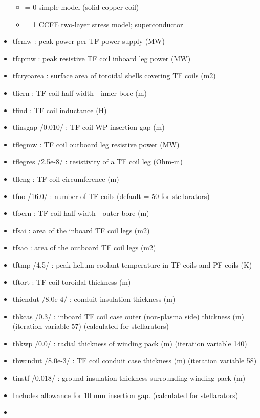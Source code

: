 \documentclass[]{article}
\begin{document}
\begin{itemize}
  \begin{itemize}
  \itemsep1pt\parskip0pt
  \item
    = 0 simple model (solid copper coil)
  \item
    = 1 CCFE two-layer stress model; superconductor
  \end{itemize}
\item
  tfcmw : peak power per TF power supply (MW)
\item
  tfcpmw : peak resistive TF coil inboard leg power (MW)
\item
  tfcryoarea : surface area of toroidal shells covering TF coils (m2)
\item
  tficrn : TF coil half-width - inner bore (m)
\item
  tfind : TF coil inductance (H)
\item
  tfinsgap /0.010/ : TF coil WP insertion gap (m)
\item
  tflegmw : TF coil outboard leg resistive power (MW)
\item
  tflegres /2.5e-8/ : resistivity of a TF coil leg (Ohm-m)
\item
  tfleng : TF coil circumference (m)
\item
  tfno /16.0/ : number of TF coils (default = 50 for stellarators)
\item
  tfocrn : TF coil half-width - outer bore (m)
\item
  tfsai : area of the inboard TF coil legs (m2)
\item
  tfsao : area of the outboard TF coil legs (m2)
\item
  tftmp /4.5/ : peak helium coolant temperature in TF coils and PF coils
  (K)
\item
  tftort : TF coil toroidal thickness (m)
\item
  thicndut /8.0e-4/ : conduit insulation thickness (m)
\item
  thkcas /0.3/ : inboard TF coil case outer (non-plasma side) thickness
  (m) (iteration variable 57) (calculated for stellarators)
\item
  thkwp /0.0/ : radial thickness of winding pack (m) (iteration variable
  140)
\item
  thwcndut /8.0e-3/ : TF coil conduit case thickness (m) (iteration
  variable 58)
\item
  tinstf /0.018/ : ground insulation thickness surrounding winding pack
  (m)
\item
  Includes allowance for 10 mm insertion gap. (calculated for
  stellarators)
\item

\end{itemize}
\end{document}
